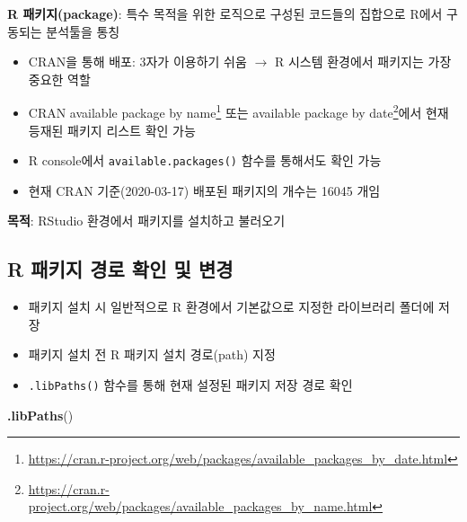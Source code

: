 \documentclass[
  11pt,
]{krantz}
\makeatletter
\newenvironment{Shaded}{\begin{snugshade}}{\end{snugshade}}
\newcommand{\KeywordTok}[1]{\textcolor[rgb]{0.27,0.27,0.27}{\textbf{#1}}}
\newcommand{\NormalTok}[1]{#1}
\providecommand{\tightlist}{%
  \setlength{\itemsep}{0pt}\setlength{\parskip}{0pt}}
\renewcommand{\href}[2]{#2\footnote{\url{#1}}}
\newenvironment{kframe}{%
\medskip{}
\setlength{\fboxsep}{.8em}
 \def\at@end@of@kframe{}%
 \ifinner\ifhmode%
  \def\at@end@of@kframe{\end{minipage}}%
  \begin{minipage}{\columnwidth}%
 \fi\fi%
 \def\FrameCommand##1{\hskip\@totalleftmargin \hskip-\fboxsep
 \colorbox{shadecolor}{##1}\hskip-\fboxsep
     \hskip-\linewidth \hskip-\@totalleftmargin \hskip\columnwidth}%
 \MakeFramed {\advance\hsize-\width
   \@totalleftmargin\z@ \linewidth\hsize
   \@setminipage}}%
 {\par\unskip\endMakeFramed%
 \at@end@of@kframe}
\newenvironment{rmdblock}[1]
  {
  \begin{itemize}
  \renewcommand{\labelitemi}{
    \raisebox{-.7\height}[0pt][0pt]{
      {\setkeys{Gin}{width=3em,keepaspectratio}\texttt{[image: images/\#1]}}
    }
  }
  \setlength{\fboxsep}{1em}
  \begin{kframe}
  \item
  }
  {
  \end{kframe}
  \end{itemize}
  }
\newenvironment{rmdnote}
  {\begin{rmdblock}{note}}
  {\end{rmdblock}}
\makeatother
\begin{document}
\begin{rmdnote}
\begin{rmdnote}

\textbf{R 패키지(package)}: 특수 목적을 위한 로직으로 구성된 코드들의 집합으로 R에서 구동되는 분석툴을 통칭

\begin{itemize}
\tightlist
\item
  CRAN을 통해 배포: 3자가 이용하기 쉬움 \(\rightarrow\) R 시스템 환경에서 패키지는 가장 중요한 역할
\item
  CRAN \href{https://cran.r-project.org/web/packages/available_packages_by_date.html}{available package by name} 또는 \href{https://cran.r-project.org/web/packages/available_packages_by_name.html}{available package by date}에서 현재 등재된 패키지 리스트 확인 가능
\item
  R console에서 \texttt{available.packages()} 함수를 통해서도 확인 가능
\item
  현재 CRAN 기준(2020-03-17) 배포된 패키지의 개수는 16045 개임
\end{itemize}

\textbf{목적}: RStudio 환경에서 패키지를 설치하고 불러오기

\end{rmdnote}
\end{rmdnote}

\normalsize

\hypertarget{r-package-path}{%
\subsection{R 패키지 경로 확인 및 변경}\label{r-package-path}}

\begin{itemize}
\tightlist
\item
  패키지 설치 시 일반적으로 R 환경에서 기본값으로 지정한 라이브러리 폴더에 저장
\item
  패키지 설치 전 R 패키지 설치 경로(path) 지정
\item
  \texttt{.libPaths()} 함수를 통해 현재 설정된 패키지 저장 경로 확인
\end{itemize}

\footnotesize

\begin{Shaded}
\begin{Highlighting}[]
\KeywordTok{.libPaths}\NormalTok{()}
\end{Highlighting}
\end{Shaded}
\end{document}
